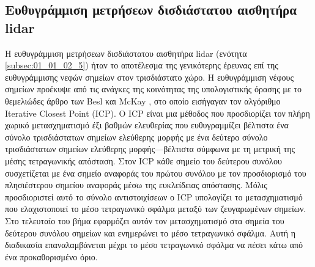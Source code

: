 \subsection{Ευθυγράμμιση μετρήσεων δισδιάστατου αισθητήρα lidar}
\label{subsection:02_02_02:1}

Η ευθυγράμμιση μετρήσεων δισδιάστατου αισθητήρα lidar (ενότητα
\ref{subsec:01_01_02_5}) ήταν το αποτέλεσμα της γενικότερης έρευνας επί της
ευθυγράμμισης νεφών σημείων στον τρισδιάστατο χώρο.  Η ευθυγράμμιση νέφους
σημείων προέκυψε από τις ανάγκες της κοινότητας της υπολογιστικής όρασης με το
θεμελιώδες άρθρο των Besl και McKay \cite{Besl1992c}, στο οποίο εισήγαγαν τον
αλγόριθμο Iterative Closest Point (ICP). Ο ICP είναι μια μέθοδος που
προσδιορίζει τον πλήρη χωρικό μετασχηματισμό έξι βαθμών ελευθερίας που
ευθυγραμμίζει βέλτιστα ένα σύνολο τρισδιάστατων σημείων ελεύθερης μορφής με ένα
δεύτερο σύνολο τρισδιάστατων σημείων ελεύθερης μορφής---βέλτιστα σύμφωνα με τη
μετρική της μέσης τετραγωνικής απόσταση. Στον ICP κάθε σημείο του δεύτερου
συνόλου συσχετίζεται με ένα σημείο αναφοράς του πρώτου συνόλου με τον
προσδιορισμό του πλησιέστερου σημείου αναφοράς μέσω της ευκλείδειας απόστασης.
Μόλις προσδιοριστεί αυτό το σύνολο αντιστοιχίσεων ο ICP υπολογίζει το
μετασχηματισμό που ελαχιστοποιεί το μέσο τετραγωνικό σφάλμα μεταξύ των
ζευγαρωμένων σημείων.  Στο τελευταίο του βήμα εφαρμόζει αυτόν τον
μετασχηματισμό στα σημεία του δεύτερου συνόλου σημείων και ενημερώνει το μέσο
τετραγωνικό σφάλμα. Αυτή η διαδικασία επαναλαμβάνεται μέχρι το μέσο τετραγωνικό
σφάλμα να πέσει κάτω από ένα προκαθορισμένο όριο.

